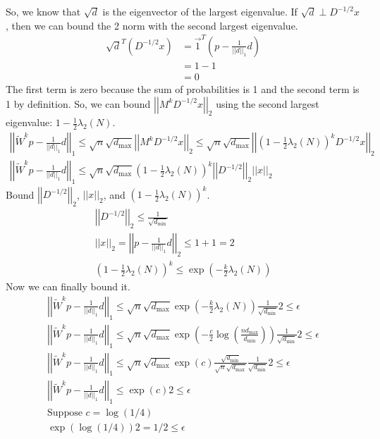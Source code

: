 \documentclass[12pt,a4paper]{article}
\begin{document}
	So, we know that $\sqrt{d}$ is the eigenvector of the largest eigenvalue. If $\sqrt{d} \perp D^{-1/2} x$, then we can bound the 2 norm with the second largest eigenvalue.
	\begin{align*}
		\sqrt{d}^T (D^{-1/2} x) 
		&= \vec{1}^T \left( p - \frac{1}{||d||_1}d \right)\\
		&= 1 - 1\\
		&= 0
	\end{align*}
	The first term is zero because the sum of probabilities is 1 and the second term is 1 by definition. So, we can bound $\left|\left|M^k D^{-1/2} x\right|\right|_2$ using the second largest eigenvalue: $1 - \frac{1}{2} \lambda_2(N)$.
	\begin{gather*}
	\left|\left|\tilde{W}^k p - \frac{1}{||d||_1}d\right|\right|_1 
	\leq \sqrt{n} \sqrt{d_{\max}} \left|\left|M^k D^{-1/2} x\right|\right|_2
	\leq \sqrt{n} \sqrt{d_{\max}} \left|\left|(1 - \frac{1}{2} \lambda_2(N))^k D^{-1/2} x\right|\right|_2\\
	\left|\left|\tilde{W}^k p - \frac{1}{||d||_1}d\right|\right|_1
	\leq \sqrt{n} \sqrt{d_{\max}} (1 - \frac{1}{2} \lambda_2(N))^k \left|\left|D^{-1/2}\right|\right|_2  \left|\left|x\right|\right|_2
	\end{gather*}
	Bound $\left|\left|D^{-1/2}\right|\right|_2$, $\left|\left|x\right|\right|_2$, and $(1 - \frac{1}{2} \lambda_2(N))^k$.
	\begin{gather*}
		\left|\left|D^{-1/2}\right|\right|_2 \leq \frac{1}{\sqrt{d_{\min}}}\\
		\left|\left|x\right|\right|_2 = \left|\left|p - \frac{1}{||d||_1}d\right|\right|_2 \leq 1 + 1 = 2\\
		(1 - \frac{1}{2} \lambda_2(N))^k \leq \exp \left( -\frac{k}{2} \lambda_2(N) \right)
	\end{gather*}
	Now we can finally bound it.
	\begin{gather*}
		\left|\left|\tilde{W}^k p - \frac{1}{||d||_1}d\right|\right|_1
		\leq \sqrt{n} \sqrt{d_{\max}} \exp \left( -\frac{k}{2} \lambda_2(N) \right) \frac{1}{\sqrt{d_{\min}}}  2 
		\leq \epsilon\\
		\left|\left|\tilde{W}^k p - \frac{1}{||d||_1}d\right|\right|_1
		\leq \sqrt{n} \sqrt{d_{\max}} \exp \left( -\frac{c}{2} \log(\frac{n d_{\max}}{d_{\min}}) \right) \frac{1}{\sqrt{d_{\min}}}  2 
		\leq \epsilon\\
		\left|\left|\tilde{W}^k p - \frac{1}{||d||_1}d\right|\right|_1
		\leq \sqrt{n} \sqrt{d_{\max}} \exp (c) \frac{\sqrt{d_{\min}}}{\sqrt{n} \sqrt{d_{\max}}} \frac{1}{\sqrt{d_{\min}}}  2 
		\leq \epsilon\\
		\left|\left|\tilde{W}^k p - \frac{1}{||d||_1}d\right|\right|_1
		\leq  \exp (c)   2 
		\leq \epsilon\\
		\text{Suppose } c = \log (1/4)\\
		\exp (\log (1/4))   2 = 1/2 \leq \epsilon
	\end{gather*}
\end{document}

